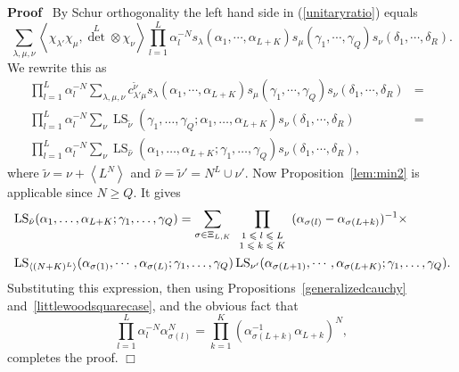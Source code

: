\documentclass[11pt]{amsart}
\newcommand{\tmop}[1]{\ensuremath{\operatorname{#1}}}
\renewenvironment{proof}{
\noindent\textbf{Proof}\ }{\hspace*{\fill}
\begin{math}\Box\end{math}\medskip}
\newcommand{\tmscript}[1]{\text{\scriptsize $#1$}}
\begin{document}
\begin{proof}
By Schur orthogonality the left hand side in (\ref{unitaryratio})
equals
\[ \sum_{\lambda, \mu, \nu} \left\langle \chi_{\lambda'} \chi_{\mu},
    {\det}^L \otimes \chi_{\nu} \right\rangle \prod_{l = 1}^L \alpha_l^{- N}
    s_{\lambda} ( \alpha_1, \cdots, \alpha_{L + K} ) s_{\mu} ( \gamma_1,
    \cdots, \gamma_Q ) s_{\nu} ( \delta_1, \cdots, \delta_R ) . \]
We rewrite this as
\begin{eqnarray*}
   \prod_{l = 1}^L \alpha_l^{- N} \sum_{\lambda, \mu, \nu}
   c^{\tilde{\nu}}_{\lambda' \mu} s_{\lambda} ( \alpha_1, \cdots, \alpha_{L +
   K} ) s_{\mu} ( \gamma_1, \cdots, \gamma_Q ) s_{\nu} ( \delta_1, \cdots,
   \delta_R ) & = & \\
   \prod_{l = 1}^L \alpha_l^{- N} \sum_{\nu} \tmop{LS}_{\tilde{\nu}} (
   \gamma_1, \ldots, \gamma_Q ; \alpha_1, \ldots, \alpha_{L + K} ) s_{\nu} (
   \delta_1, \cdots, \delta_R ) & = & \\
   \prod_{l = 1}^L \alpha_l^{- N} \sum_{\nu} \tmop{LS}_{\hat{\nu}} (
   \alpha_1, \ldots, \alpha_{L + K} ; \gamma_1, \ldots, \gamma_Q ) s_{\nu} (
   \delta_1, \cdots, \delta_R ), &  &
\end{eqnarray*}
where $\tilde{\nu} = \nu + \left\langle L^N \right\rangle$ and
$\hat{\nu} = \tilde{\nu}' = N^L \cup \nu'$. Now
Proposition~\ref{lem:min2} is applicable since $N \geqslant Q$. It
gives
\begin{equation*}
\begin{aligned}
&  \tmop{LS}_{\hat{\nu}} ( \alpha_1, \ldots, \alpha_{L + K} ;
\gamma_1,
   \ldots, \gamma_Q )  =
   \sum_{\sigma \in \Xi_{L, K}} \prod_{\tmscript{\begin{array}{c}
     1 \leqslant l \leqslant L\\
     1 \leqslant k \leqslant K
   \end{array}}} ( \alpha_{\sigma ( l )} - \alpha_{\sigma ( L + k )} )^{-
   1}\times
   \\
   & \tmop{LS}_{\left\langle ( N + K )^L \right\rangle} ( \alpha_{\sigma
   ( 1 )}, \cdots, \alpha_{\sigma ( L )} ; \gamma_1, \ldots, \gamma_Q )
   \tmop{LS}_{\nu'} ( \alpha_{\sigma ( L + 1 )}, \cdots, \alpha_{\sigma ( L +
   K )} ; \gamma_1, \ldots, \gamma_Q ).
   \end{aligned}
\end{equation*}
Substituting this expression, then using
Propositions~\ref{generalizedcauchy}
and~\ref{littlewoodsquarecase}, and the obvious fact that
\begin{equation}
   \label{zfcobvious} \prod_{l = 1}^L \alpha_l^{- N} \alpha_{\sigma ( l )}^N
   = \prod_{k = 1}^K ( \alpha_{\sigma ( L + k )}^{- 1} \alpha_{L + k} )^N,
\end{equation}
completes the proof.
\end{proof}
\end{document}
